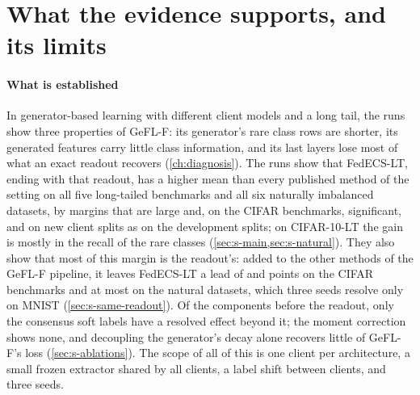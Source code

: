 \section{What the evidence supports, and its limits}\label{ch:limits}

\paragraph{What is established} In generator-based learning with different client models and a long tail, the runs
show three properties of GeFL-F: its generator's rare class rows are shorter, its generated features carry little class
information, and its last layers lose most of what an exact readout recovers (\cref{ch:diagnosis}). The runs show that
FedECS-LT, ending with that readout, has a higher mean than every published method of the setting on all five
long-tailed benchmarks and all six naturally imbalanced datasets, by margins that are large and, on the CIFAR
benchmarks, significant, and on new client splits as on the development splits; on CIFAR-10-LT the gain is mostly in the recall
of the rare classes (\cref{sec:s-main,sec:s-natural}). They also show that most of this margin is the readout's:
added to the other methods of the GeFL-F pipeline, it leaves FedECS-LT a lead of  and
 points on the CIFAR benchmarks and at most  on the natural datasets,
which three seeds resolve only on MNIST (\cref{sec:s-same-readout}). Of the components before the readout, only the
consensus soft labels have a resolved effect beyond it; the moment correction shows none, and decoupling the
generator's decay alone recovers little of GeFL-F's loss (\cref{sec:s-ablations}). The scope of all of this is one client per architecture, a small frozen extractor shared
by all clients, a label shift between clients, and three seeds.

